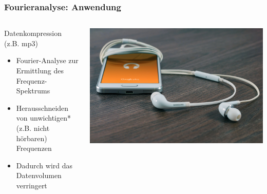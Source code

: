 \documentclass{beamer}
\begin{document}
\begin{frame}
\frametitle{Fourieranalyse: Anwendung}

\begin{columns}[c]

\begin{column}{5cm}
\begin{block}{Datenkompression\\ (z.B. mp3)}

\begin{itemize}
\item
Fourier-Analyse zur Ermittlung des Frequenz-Spektrums
\item
Herausschneiden von unwichtigen* (z.B. nicht hörbaren) Frequenzen
\item
Dadurch wird das Datenvolumen verringert
\end{itemize}

\end{block}

\end{column}


\begin{column}{5cm}

\begin{center}
\includegraphics[width=\textwidth]{phone_music.jpg}
\end{center}

\end{column}

\end{columns}


\end{frame}




\end{document}
